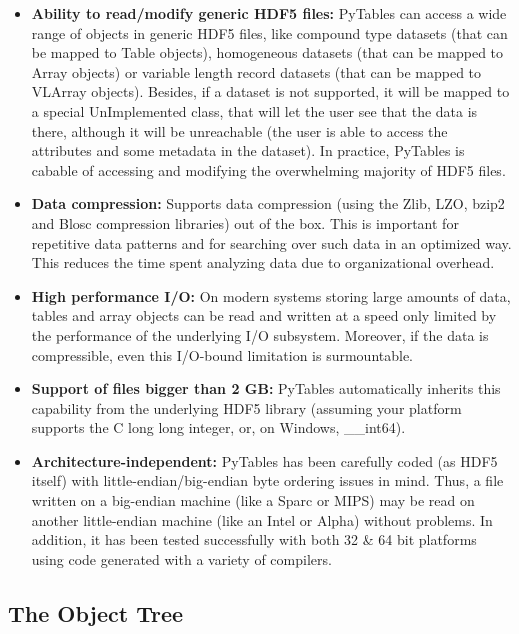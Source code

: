 \begin{itemize}
\item \textbf{Ability to read/modify generic HDF5
  files:} PyTables can access a wide range of objects in
  generic HDF5 files, like compound type datasets (that can be
  mapped to Table objects), homogeneous datasets
  (that can be mapped to Array objects) or
  variable length record datasets (that can be mapped to
  VLArray objects). Besides, if a dataset is not
  supported, it will be mapped to a special
  UnImplemented class,
  that will let the user see that the data is there, although it
  will be unreachable (the user is able to access the
  attributes and some metadata in the dataset). In practice, PyTables
  is cabable of accessing and modifying the overwhelming majority of
  HDF5 files.

\item \textbf{Data compression:} Supports data
  compression (using the Zlib, LZO, bzip2
  and Blosc compression libraries) out of the
  box. This is important for repetitive data patterns and
  for searching over such data in an optimized way. This 
  reduces the time spent analyzing data due to organizational 
    overhead.

\item \textbf{High performance I/O:} On modern systems
  storing large amounts of data, tables and array objects can be
  read and written at a speed only limited by the performance of the
  underlying I/O subsystem. Moreover, if the data is compressible,
  even this I/O-bound limitation is surmountable.

\item \textbf{Support of files bigger than 2 GB:}
  PyTables automatically inherits this capability from the
  underlying HDF5 library (assuming your platform supports the C
  long long integer, or, on Windows, \_\_int64).

\item \textbf{Architecture-independent:} PyTables has
  been carefully coded (as HDF5 itself) with
  little-endian/big-endian byte ordering issues in mind. Thus, a
  file written on a big-endian machine (like a Sparc or MIPS) may be
  read on another little-endian machine (like an Intel or Alpha)
  without problems. In addition, it has been tested successfully
  with both 32 \& 64 bit platforms using code generated with a variety 
  of compilers.

\end{itemize}


\subsection{The Object Tree}

